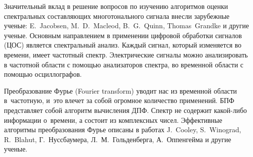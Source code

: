 Значительный вклад в решение вопросов по изучению алгоритмов оценки спектральных составляющих многотонального сигнала внесли зарубежные ученые:
E.~Jacobsen, 
M.~D.~Macleod,
B.~G.~Quinn,
Thomas~Grandke и другие ученые.
Основным направлением в применении цифровой обработки сигналов (ЦОС) является спектральный анализ. Каждый сигнал, который изменяется во времени, имеет частотный спектр. Электрические сигналы можно анализировать в частотной области с помощью анализаторов спектра, во временной области с помощью осциллографов. 

Преобразование Фурье (Fourier transform) уводит нас из временной области в частотную, и это влечет за собой огромное количество применений. 
БПФ представляет собой алгоритм вычисления ДПФ. Спектр не содержит какой-либо информации о времени, а состоит из комплексных чисел. Эффективные алгоритмы преобразования Фурье описаны в работах J.~Cooley, S.~Winograd, R.~Blahut, Г.~Нуссбаумера, Л.~М.~Гольденберга, А.~Оппенгейма и другие ученые.

